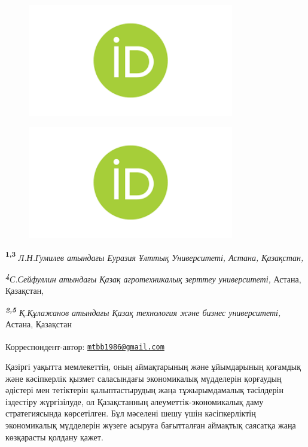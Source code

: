 \begin{figure}[H]
	\centering
	\includegraphics[width=0.8\textwidth]{media/ekon/image6}
	\caption*{}
\end{figure}

\begin{figure}[H]
	\centering
	\includegraphics[width=0.8\textwidth]{media/ekon/image6}
	\caption*{}
\end{figure}


{\bfseries \textsuperscript{1,3}} \emph{Л.Н.Гумилев атындағы Еуразия Ұлттық
Университеті, Астана, Қазақстан,}

\emph{{\bfseries \textsuperscript{4}}С.Сейфуллин атындағы Қазақ
агротехникалық зерттеу университеті,} Астана, Қазақстан,

\emph{{\bfseries \textsuperscript{2,5}} Қ.Құлажанов атындағы Қазақ
технология және бизнес университеті,} Астана, Қазақстан

{\bfseries \textsuperscript{\envelope }}Корреспондент-автор:
\href{mailto:mtbb1986@gmail.com}{\nolinkurl{mtbb1986@gmail.com}}

Қазіргі уақытта мемлекеттің, оның аймақтарының және ұйымдарының қоғамдық
және кәсіпкерлік қызмет саласындағы экономикалық мүдделерін қорғаудың
әдістері мен тетіктерін қалыптастырудың жаңа тұжырымдамалық тәсілдерін
іздестіру жүргізілуде, ол Қазақстанның әлеуметтік-экономикалық даму
стратегиясында көрсетілген. Бұл мәселені шешу үшін кәсіпкерліктің
экономикалық мүдделерін жүзеге асыруға бағытталған аймақтық саясатқа
жаңа көзқарасты қолдану қажет.

